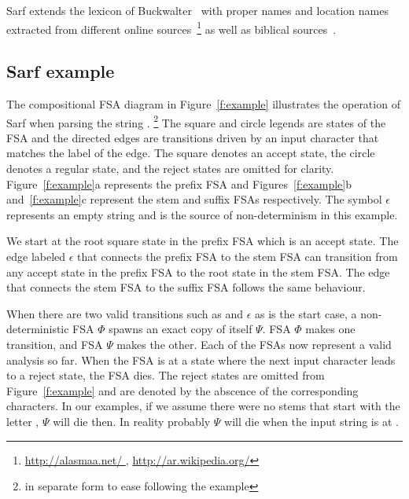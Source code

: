 \documentclass[11pt,letterpaper]{article}
\begin{document}
Sarf extends the lexicon of Buckwalter~ with 
proper names and location names extracted from different online 
sources~\footnote{\href{http://alasmaa.net/}{http://alasmaa.net/ }, 
\href{http://ar.wikipedia.org/}{http://ar.wikipedia.org/}}
as well as biblical sources~\cite{}. 


\subsection{Sarf example }
\label{sec:example}

\begin{figure*}[tb]
\end{figure*}

The compositional FSA diagram in Figure~\ref{f:example}
illustrates the operation of Sarf when parsing the
string .
\footnote{ 
%
in separate form to ease following the example
}
The square and circle legends are states of the FSA
and the directed edges are transitions driven by an input
character that matches the label of the edge. 
The square denotes an accept state, 
the circle denotes a regular state, and the reject states
are omitted for clarity. 
Figure~\ref{f:example}a represents the prefix FSA and 
Figures~\ref{f:example}b and~\ref{f:example}c represent the 
stem and suffix FSAs respectively. 
The symbol $\epsilon$ represents an empty string and is 
the source of non-determinism in this example. 

We start at the root square state in the prefix FSA
which is an accept state. 
The edge labeled $\epsilon$ that connects the prefix 
FSA to the stem FSA can transition from any accept state
in the prefix FSA to the root state in the stem FSA.
The edge that connects the stem FSA to the suffix FSA
follows the same behaviour. 

When there are two valid transitions such as  
and $\epsilon$ as is the start case, a non-deterministic 
FSA $\Phi$ spawns an exact copy of itself $\Psi$. FSA $\Phi$
makes one transition, and FSA $\Psi$ makes the other. 
Each of the FSAs now represent a valid analysis so far. 
When the FSA is at a state where the next input character
leads to a reject state, the FSA dies.
The reject states are omitted from Figure~\ref{f:example}
and are denoted by the abscence of the corresponding 
characters. 
In our examples, if we assume there were no stems that start 
with the letter , $\Psi$ will die then. 
In reality probably $\Psi$ will die when the input string
is at . 
\end{document}
